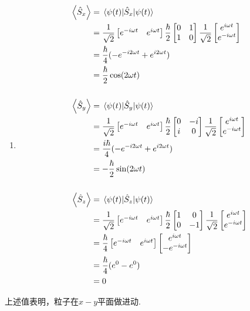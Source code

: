 \begin{solution}
\begin{enumerate}
        \item \[\begin{aligned}
        \ev{\hat{S}_x} &= \mel{\psi(t)}{\hat{S}_x}{\psi(t)} \\
        &= \frac{1}{\sqrt{2}} \begin{bmatrix} e^{-i\omega t} & e^{i\omega t} \end{bmatrix} \frac{\hbar}{2} \begin{bmatrix} 0 & 1 \\ 1 & 0 \end{bmatrix} \frac{1}{\sqrt{2}} \begin{bmatrix} e^{i\omega t} \\ e^{-i\omega t} \end{bmatrix} \\
        &= \frac{\hbar}{4} (-e^{-i2\omega t} + e^{i2\omega t}) \\
        &= \frac{\hbar}{2} \cos(2\omega t) \\[1.5em]
        \ev{\hat{S}_y} &= \mel{\psi(t)}{\hat{S}_y}{\psi(t)} \\
        &= \frac{1}{\sqrt{2}} \begin{bmatrix} e^{-i\omega t} & e^{i\omega t} \end{bmatrix} \frac{\hbar}{2} \begin{bmatrix} 0 & -i \\ i & 0 \end{bmatrix} \frac{1}{\sqrt{2}} \begin{bmatrix} e^{i\omega t} \\ e^{-i\omega t} \end{bmatrix} \\
        &= \frac{i\hbar}{4} (-e^{-i2\omega t} + e^{i2\omega t}) \\
        &= -\frac{\hbar}{2} \sin(2\omega t) \\[1.5em]
        \ev{\hat{S}_z} &= \mel{\psi(t)}{\hat{S}_z}{\psi(t)} \\
        &= \frac{1}{\sqrt{2}} \begin{bmatrix} e^{-i\omega t} & e^{i\omega t} \end{bmatrix} \frac{\hbar}{2} \begin{bmatrix} 1 & 0 \\ 0 & -1 \end{bmatrix} \frac{1}{\sqrt{2}} \begin{bmatrix} e^{i\omega t} \\ e^{-i\omega t} \end{bmatrix} \\
        &= \frac{\hbar}{4} \begin{bmatrix} e^{-i\omega t} & e^{i\omega t} \end{bmatrix} \begin{bmatrix} e^{i\omega t} \\ -e^{-i\omega t} \end{bmatrix} \\
        &= \frac{\hbar}{4} (e^0 - e^0) \\
        &= 0
        \end{aligned}\]
    \end{enumerate}
\end{solution}
上述值表明，粒子在$x-y$平面做进动.


